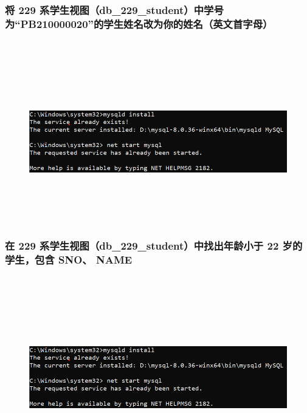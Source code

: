 \documentclass{ctexart}
\begin{document}
\subsubsection{将 229 系学生视图（db\_229\_student）中学号为“PB210000020”的学生姓名改为{你的姓名（英文首字母）}}
\begin{lstlisting}[language=sql]
	
\end{lstlisting}
\begin{figure}[H]
	\centering 
	\includegraphics[height=7cm,width=14cm]{1.png}
	\end{figure}
\subsubsection{在 229 系学生视图（db\_229\_student）中找出年龄小于 22 岁的学生，包含 SNO、 NAME}
\begin{lstlisting}[language=sql]
	
\end{lstlisting}
\begin{figure}[H]
	\centering 
	\includegraphics[height=7cm,width=14cm]{1.png}
	\end{figure}
\end{document}
